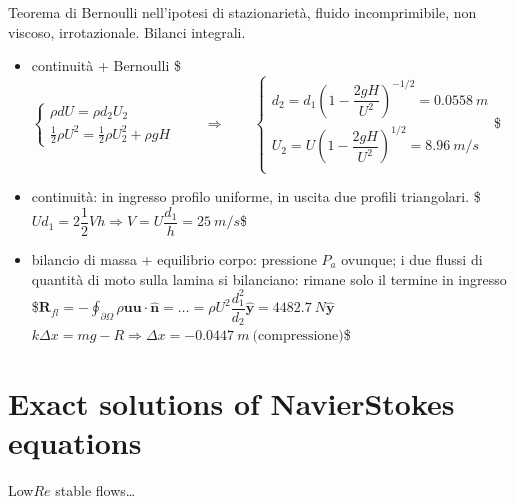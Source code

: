 \documentclass[letterpaper,10pt,italian]{jupyterBook}
\begin{document}
\sphinxAtStartPar
Teorema di Bernoulli nell’ipotesi di stazionarietà, fluido
incomprimibile, non viscoso, irrotazionale. Bilanci integrali.
\begin{itemize}
\item {} 
\sphinxAtStartPar
continuità + Bernoulli \$\(\begin{cases}
        \rho d U = \rho d_2 U_2 \\
        \frac{1}{2} \rho U^2 = \frac{1}{2} \rho U_2^2 + \rho g H
      \end{cases}
      \qquad \Rightarrow \qquad
      \begin{cases}
        d_2 = d_1 \left( 1 - \dfrac{2 g H}{U^2} \right)^{-1/2} = 0.0558 \ m \\
        U_2 = U \left( 1 - \dfrac{2 g H}{U^2} \right)^{1/2} = 8.96 \ m/s \\
      \end{cases}\)\$

\item {} 
\sphinxAtStartPar
continuità: in ingresso profilo uniforme, in uscita due profili
triangolari.
\$\(U d_1 = 2 \dfrac{1}{2} V h \Rightarrow V = U \dfrac{d_1}{h} = 25 \ m/s\)\$

\item {} 
\sphinxAtStartPar
bilancio di massa + equilibrio corpo: pressione \(P_a\) ovunque; i due
flussi di quantità di moto sulla lamina si bilanciano: rimane solo
il termine in ingresso
\$\(\bm{R}_{fl} = - \oint_{\partial \Omega} \rho \bm{u} \bm{u}
    \cdot \bm{\hat{n}}  =  \dots  = \rho U^2 \dfrac{d_1^2}{d_2} \bm{\hat{y}} = 4482.7 \ N \bm{\hat{y}}\)\(
\)\(k \Delta x = m g - R \Rightarrow \Delta x = - 0.0447 \ m \ \text{(compressione)}\)\$

\end{itemize}

\sphinxstepscope


\chapter{Exact solutions of Navier\sphinxhyphen{}Stokes equations}
\label{\detokenize{polimi/fluidmechanics-ita/template/capitoli/06_slnEsatte/0600in:exact-solutions-of-navier-stokes-equations}}\label{\detokenize{polimi/fluidmechanics-ita/template/capitoli/06_slnEsatte/0600in:fluid-mechanics-exact-solutions}}\label{\detokenize{polimi/fluidmechanics-ita/template/capitoli/06_slnEsatte/0600in::doc}}
\sphinxAtStartPar
{}  Low\sphinxhyphen{}\(Re\) stable flows…
\end{document}
